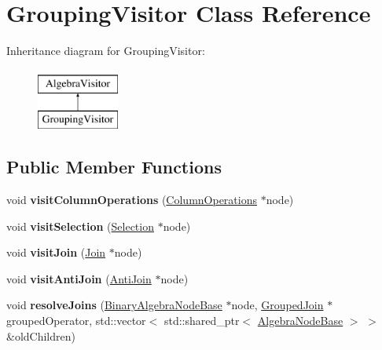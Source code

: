 \hypertarget{class_grouping_visitor}{\section{Grouping\+Visitor Class Reference}
\label{class_grouping_visitor}
}
Inheritance diagram for Grouping\+Visitor\+:\begin{figure}[H]
\begin{center}
\leavevmode
\includegraphics[height=2.000000cm]{class_grouping_visitor}
\end{center}
\end{figure}
\subsection*{Public Member Functions}
\begin{DoxyCompactItemize}
\item 
\hypertarget{class_grouping_visitor_a2c1557a18e53aaa43665318001df3726}{void {\bfseries visit\+Column\+Operations} (\hyperlink{class_column_operations}{Column\+Operations} $\ast$node)}\label{class_grouping_visitor_a2c1557a18e53aaa43665318001df3726}

\item 
\hypertarget{class_grouping_visitor_a4e3563b131b9d26942a6d4693f5c194a}{void {\bfseries visit\+Selection} (\hyperlink{class_selection}{Selection} $\ast$node)}\label{class_grouping_visitor_a4e3563b131b9d26942a6d4693f5c194a}

\item 
\hypertarget{class_grouping_visitor_aaa2345624497de18ab3a608e909573aa}{void {\bfseries visit\+Join} (\hyperlink{class_join}{Join} $\ast$node)}\label{class_grouping_visitor_aaa2345624497de18ab3a608e909573aa}

\item 
\hypertarget{class_grouping_visitor_a1ddb0cf950feb1df7c2518b543e0d0ad}{void {\bfseries visit\+Anti\+Join} (\hyperlink{class_anti_join}{Anti\+Join} $\ast$node)}\label{class_grouping_visitor_a1ddb0cf950feb1df7c2518b543e0d0ad}

\item 
\hypertarget{class_grouping_visitor_aa36813aa195f82b46a29f079b4ef56df}{void {\bfseries resolve\+Joins} (\hyperlink{class_binary_algebra_node_base}{Binary\+Algebra\+Node\+Base} $\ast$node, \hyperlink{class_grouped_join}{Grouped\+Join} $\ast$grouped\+Operator, std\+::vector$<$ std\+::shared\+\_\+ptr$<$ \hyperlink{class_algebra_node_base}{Algebra\+Node\+Base} $>$ $>$ \&old\+Children)}\label{class_grouping_visitor_aa36813aa195f82b46a29f079b4ef56df}

\end{DoxyCompactItemize}
